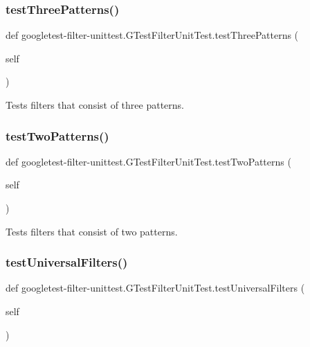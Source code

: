 \subsubsection{\texorpdfstring{testThreePatterns()}{testThreePatterns()}}
{\footnotesize\ttfamily def googletest-\/filter-\/unittest.\+G\+Test\+Filter\+Unit\+Test.\+test\+Three\+Patterns (\begin{DoxyParamCaption}\item[{}]{self }\end{DoxyParamCaption})}

\begin{DoxyVerb}Tests filters that consist of three patterns.\end{DoxyVerb}
 \mbox{\label{classgoogletest-filter-unittest_1_1GTestFilterUnitTest_a7b2e7e1424bd6be9cbd15a401017c442}} 
\subsubsection{\texorpdfstring{testTwoPatterns()}{testTwoPatterns()}}
{\footnotesize\ttfamily def googletest-\/filter-\/unittest.\+G\+Test\+Filter\+Unit\+Test.\+test\+Two\+Patterns (\begin{DoxyParamCaption}\item[{}]{self }\end{DoxyParamCaption})}

\begin{DoxyVerb}Tests filters that consist of two patterns.\end{DoxyVerb}
 \mbox{\label{classgoogletest-filter-unittest_1_1GTestFilterUnitTest_a6b3267ec5eb1a4d335d2f969d28329dd}} 
\subsubsection{\texorpdfstring{testUniversalFilters()}{testUniversalFilters()}}
{\footnotesize\ttfamily def googletest-\/filter-\/unittest.\+G\+Test\+Filter\+Unit\+Test.\+test\+Universal\+Filters (\begin{DoxyParamCaption}\item[{}]{self }\end{DoxyParamCaption})}

